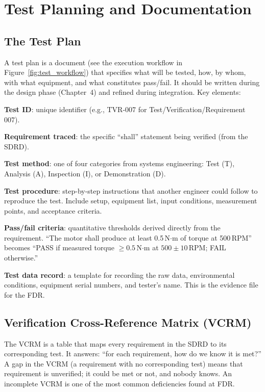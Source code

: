 \documentclass[11pt,letterpaper,twoside,openany]{book}
\begin{document}
\section{Test Planning and Documentation}
\subsection{The Test Plan}
A test plan is a document (see the execution workflow in Figure~\ref{fig:test_workflow}) that specifies what will be tested, how, by whom, with what equipment, and what constitutes pass/fail. It should be written during the design phase (Chapter~4) and refined during integration. Key elements:

\textbf{Test ID}: unique identifier (e.g., TVR-007 for Test/Verification/Requirement 007).

\textbf{Requirement traced}: the specific ``shall'' statement being verified (from the SDRD).

\textbf{Test method}: one of four categories from systems engineering: Test (T), Analysis (A), Inspection (I), or Demonstration (D).

\textbf{Test procedure}: step-by-step instructions that another engineer could follow to reproduce the test. Include setup, equipment list, input conditions, measurement points, and acceptance criteria.

\textbf{Pass/fail criteria}: quantitative thresholds derived directly from the requirement. ``The motor shall produce at least 0.5\,N$\cdot$m of torque at 500\,RPM'' becomes ``PASS if measured torque $\geq 0.5$\,N$\cdot$m at $500 \pm 10$\,RPM; FAIL otherwise.''

\textbf{Test data record}: a template for recording the raw data, environmental conditions, equipment serial numbers, and tester's name. This is the evidence file for the FDR.

\subsection{Verification Cross-Reference Matrix (VCRM)}
The VCRM is a table that maps every requirement in the SDRD to its corresponding test. It answers: ``for each requirement, how do we know it is met?'' A gap in the VCRM (a requirement with no corresponding test) means that requirement is unverified; it could be met or not, and nobody knows. An incomplete VCRM is one of the most common deficiencies found at FDR.
\end{document}

